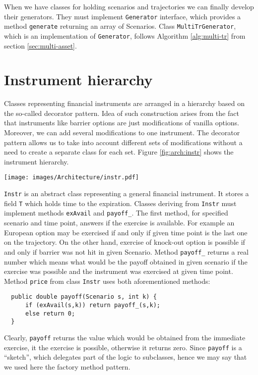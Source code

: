 \documentclass[a4paper,11pt, twoside]{book}
\theoremstyle{definition}
\theoremstyle{remark}
\newcounter{example}[chapter]
\begin{document}
When we have classes for holding scenarios and trajectories we can finally develop their generators. They must implement \texttt{Generator} interface, which provides a method \texttt{generate} returning an array of Scenarios. Class \texttt{MultiTrGenerator}, which is an implementation of \texttt{Generator}, follows Algorithm \ref{alg:multi-tr} from section \ref{sec:multi-asset}.

\section{Instrument hierarchy}
\lstset{language=Java, basicstyle=\small}

Classes representing financial instruments are arranged in a hierarchy based on the so-called decorator pattern. Idea of such construction arises from the fact that instruments like barrier options are just modifications of vanilla options. Moreover, we can add several modifications to one instrument. The decorator pattern allows us to take into account different sets of modifications without a need to create a separate class for each set. Figure \ref{fig:arch:instr} shows the instrument hierarchy.
\begin{sidewaysfigure}
\centering
 \texttt{[image: images/Architecture/instr.pdf]}
\caption{Class diagram presenting the hierarchy of financial instruments.}
\label{fig:arch:instr}
\end{sidewaysfigure}


\texttt{Instr} is an abstract class representing a general financial instrument. It stores a field \texttt{T} which holds time to the expiration. Classes deriving from \texttt{Instr} must implement methods \texttt{exAvail} and \texttt{payoff\_}. The first method, for specified scenario and time point, answers if the exercise is available. For example an European option may be exercised if and only if given time point is the last one on the trajectory. On the other hand, exercise of knock-out option is possible if and only if barrier was not hit in given Scenario. Method \texttt{payoff\_} returns a real number which means what would be the payoff obtained in given scenario if the exercise was possible and the instrument was exercised at given time point. Method \texttt{price} from class \texttt{Instr} uses both aforementioned methods:
\begin{lstlisting}
  public double payoff(Scenario s, int k) {
      if (exAvail(s,k)) return payoff_(s,k);
      else return 0;
  }
\end{lstlisting}
Clearly, \texttt{payoff} returns the value which would be obtained from the immediate exercise, it the exercise is possible, otherwise it returns zero. Since \texttt{payoff} is a ``sketch'', which delegates part of the logic to subclasses, hence we may say that we used here the factory method pattern. 
\end{document}
